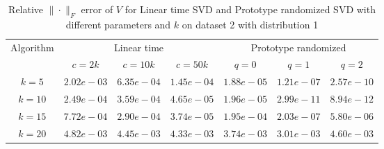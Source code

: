 \begin{table}\label{V21}
\centering
\begin{tabular}{|c|c|c|c|c|c|c|}

\hline
\multirow{2}{*}{ Algorithm} &\multicolumn{3}{c|}{Linear time} &\multicolumn{3}{c|}{Prototype randomized}\\\cline{2-7}
 &$c=2k$ &$c=10k$ &$c=50k$ &$q=0$ &$q=1$ &$q=2$\\\hline
$k=5$ & $2.02e-03$ & $6.35e-04$ & $1.45e-04$ & $1.88e-05$ & $1.21e-07$ & $2.57e-10$\\\hline
$k=10$ & $2.49e-04$ & $3.59e-04$ & $4.65e-05$ & $1.96e-05$ & $2.99e-11$ & $8.94e-12$\\\hline
$k=15$ & $7.72e-04$ & $2.90e-04$ & $3.74e-05$ & $1.95e-04$ & $2.03e-07$ & $5.80e-06$\\\hline
$k=20$ & $4.82e-03$ & $4.45e-03$ & $4.33e-03$ & $3.74e-03$ & $3.01e-03$ & $4.60e-03$\\\hline
\end{tabular}
\caption{Relative $\|\cdot\|_F$ error of $V$ for Linear time SVD and Prototype randomized SVD with different parameters and $k$ on dataset 2 with distribution 1}
\end{table}
